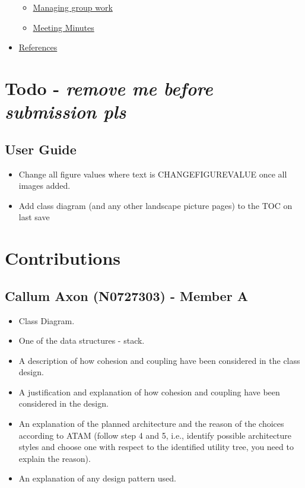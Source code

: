 \documentclass[
  english,
  a4paper,
,tablecaptionabove
]{scrartcl}
\providecommand{\tightlist}{%
  \setlength{\itemsep}{0pt}\setlength{\parskip}{0pt}}
\begin{document}
\begin{itemize}
  \begin{itemize}
  \tightlist
  \item
    \protect\hyperlink{managing-group-work}{Managing group work}
  \item
    \protect\hyperlink{meeting-minutes}{Meeting Minutes}
  \end{itemize}
\item
  \protect\hyperlink{references}{References}
\end{itemize}

\newpage

\hypertarget{todo---remove-me-before-submission-pls}{%
\section{\texorpdfstring{Todo - \textbf{\emph{remove me before
submission
pls}}}{Todo - remove me before submission pls}}\label{todo---remove-me-before-submission-pls}}

\hypertarget{user-guide}{%
\subsection{User Guide}\label{user-guide}}

\begin{itemize}
\tightlist
\item
  Change all figure values where text is CHANGEFIGUREVALUE once all
  images added.
\item
  Add class diagram (and any other landscape picture pages) to the TOC
  on last save
\end{itemize}

\newpage

\hypertarget{contributions}{%
\section{Contributions}\label{contributions}}

\hypertarget{callum-axon-n0727303---member-a}{%
\subsection{Callum Axon (N0727303) - Member
A}\label{callum-axon-n0727303---member-a}}

\begin{itemize}
\tightlist
\item
  Class Diagram.
\item
  One of the data structures - stack.
\item
  A description of how cohesion and coupling have been considered in the
  class design.
\item
  A justification and explanation of how cohesion and coupling have been
  considered in the design.
\item
  An explanation of the planned architecture and the reason of the
  choices according to ATAM (follow step 4 and 5, i.e., identify
  possible architecture styles and choose one with respect to the
  identified utility tree, you need to explain the reason).
\item
  An explanation of any design pattern used.
\end{itemize}
\end{document}
